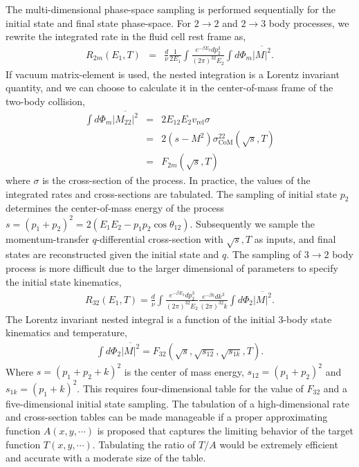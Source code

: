 The multi-dimensional phase-space sampling is performed sequentially for the initial state and final state phase-space.
For $2\rightarrow 2$ and $2\rightarrow 3$ body processes, we rewrite the integrated rate in the fluid cell rest frame as,
\begin{eqnarray}
R_{2m}(E_1, T) &=& \frac{d}{\nu} \frac{1}{2E_1}\int \frac{e^{-\beta E_2}dp_2^3}{(2\pi)^32E_2} 
\int d\Phi_m\overline{|M|^2}.
\end{eqnarray}
If vacuum matrix-element is used, the nested integration is a Lorentz invariant quantity, and we can choose to calculate it in the center-of-mass frame of the two-body collision, 
\begin{eqnarray}
\int d\Phi_m\overline{|M_{22}|^2} &=& 2E_12E_2v_{\textrm{rel}}\sigma \nonumber \\
 &=& 2(s-M^2)\sigma_{\textrm{CoM}}^{22}(\sqrt{s}, T)\nonumber \\
  &=& F_{2m}(\sqrt{s}, T)
\end{eqnarray}
where $\sigma$ is the cross-section of the process.
In practice, the values of the integrated rates and cross-sections are tabulated. 
The sampling of initial state $p_2$ determines the center-of-mass energy of the process $s = (p_1+p_2)^2 = 2(E_1 E_2 - p_1p_2 \cos\theta_{12})$.
Subsequently we sample the momentum-transfer $q$-differential cross-section with $\sqrt{s}, T$ as inputs, and final states are reconstructed given the initial state and $q$.
The sampling of $3\rightarrow 2$ body process is more difficult due to the larger dimensional of parameters to specify the initial state kinematics,
\begin{eqnarray}
R_{32}(E_1, T) = \frac{d}{\nu} \int \frac{e^{-\beta E_2}dp_2^3}{(2\pi)^32E_2} \frac{e^{-\beta k}dk^3}{(2\pi)^32k}
\int d\Phi_2\overline{|M|^2}.
\end{eqnarray}
The Lorentz invariant nested integral is a function of the initial 3-body state kinematics and temperature,
\begin{eqnarray}
\int d\Phi_2\overline{|M|^2} = F_{32}(\sqrt{s}, \sqrt{s_{12}}, \sqrt{s_{1k}}, T).
\end{eqnarray}
Where $s = (p_1+p_2+k)^2$ is the center of mass energy, $s_{12} = (p_1+p_2)^2$ and $s_{1k} = (p_1+k)^2$.
This requires four-dimensional table for the value of $F_{32}$ and a five-dimensional initial state sampling.
The tabulation of a high-dimensional rate and cross-section tables can be made manageable if a proper approximating function $A(x, y, \cdots)$ is proposed that captures the limiting behavior of the target function $T(x, y, \cdots)$.
Tabulating the ratio of $T/A$ would be extremely efficient and accurate with a moderate size of the table.

